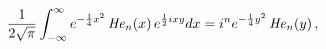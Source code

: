 \[\frac{1}{2\sqrt{\pi}}\int_{-\infty}^{\infty}e^{-\frac{1}{4}x^{2}}\mathop{%
\mathit{He}_{n}\/}\nolimits\!\left(x\right)e^{\frac{1}{2}ixy}dx=i^{n}e^{-\frac%
{1}{4}y^{2}}\mathop{\mathit{He}_{n}\/}\nolimits\!\left(y\right),\]